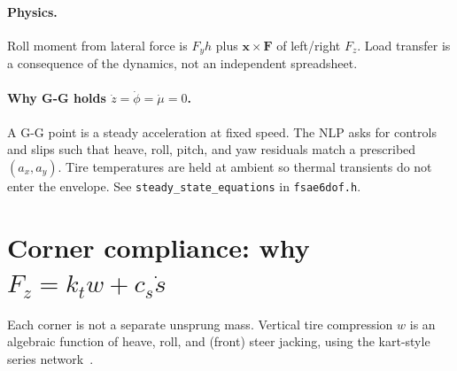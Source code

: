 \documentclass[11pt,letterpaper]{article}
\newcommand{\eng}[1]{\paragraph{Physics.} #1}
\begin{document}
\eng{Roll moment from lateral force is $F_y h$ plus
$\mathbf{x}\times\mathbf{F}$ of left/right $F_z$. Load transfer is a
consequence of the dynamics, not an independent spreadsheet.}

\paragraph{Why G-G holds $\dot z=\dot\phi=\dot\mu=0$.}
A G-G point is a steady acceleration at fixed speed. The NLP asks for
controls and slips such that heave, roll, pitch, and yaw residuals
match a prescribed $(a_x,a_y)$. Tire temperatures are held at ambient
so thermal transients do not enter the envelope. See
\texttt{steady\_state\_equations} in \texttt{fsae6dof.h}.

\section{Corner compliance: why $F_z = k_t w + c_s \dot s$}
\label{sec:corner}

Each corner is not a separate unsprung mass. Vertical tire compression
$w$ is an algebraic function of heave, roll, and (front) steer jacking,
using the kart-style series network~\cite{manzanero-fastestlap}.
\end{document}
